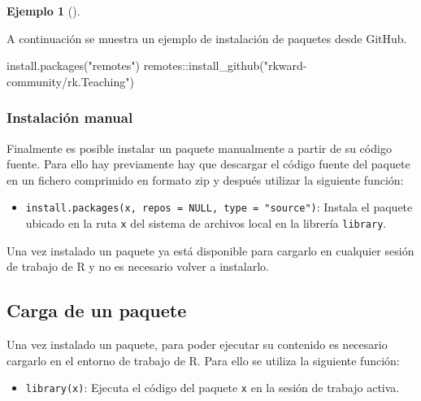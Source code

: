 \documentclass[
  a4paper,
]{scrreport}
\newenvironment{Shaded}{\begin{snugshade}}{\end{snugshade}}
\newcommand{\FunctionTok}[1]{\textcolor[rgb]{0.28,0.35,0.67}{#1}}
\newcommand{\NormalTok}[1]{\textcolor[rgb]{0.00,0.23,0.31}{#1}}
\newcommand{\SpecialCharTok}[1]{\textcolor[rgb]{0.37,0.37,0.37}{#1}}
\newcommand{\StringTok}[1]{\textcolor[rgb]{0.13,0.47,0.30}{#1}}
\providecommand{\tightlist}{%
  \setlength{\itemsep}{0pt}\setlength{\parskip}{0pt}}\usepackage{longtable,booktabs,array}
\theoremstyle{definition}
\newtheorem{example}{Ejemplo}[chapter]
\theoremstyle{definition}
\theoremstyle{remark}
\begin{document}
\leavevmode{}%
\begin{example}[]\label{exm-instalacion-paquetes-github}

A continuación se muestra un ejemplo de instalación de paquetes desde
GitHub.

\begin{Shaded}
\begin{Highlighting}[]
\FunctionTok{install.packages}\NormalTok{(}\StringTok{"remotes"}\NormalTok{)}
\NormalTok{remotes}\SpecialCharTok{::}\FunctionTok{install\_github}\NormalTok{(}\StringTok{"rkward{-}community/rk.Teaching"}\NormalTok{)}
\end{Highlighting}
\end{Shaded}

\end{example}

\hypertarget{instalaciuxf3n-manual}{%
\subsubsection{Instalación manual}\label{instalaciuxf3n-manual}}

Finalmente es posible instalar un paquete manualmente a partir de su
código fuente. Para ello hay previamente hay que descargar el código
fuente del paquete en un fichero comprimido en formato zip y después
utilizar la siguiente función:

\begin{itemize}
\tightlist
\item
  \texttt{install.packages(x,\ repos\ =\ NULL,\ type\ =\ "source")}:
  Instala el paquete ubicado en la ruta \texttt{x} del sistema de
  archivos local en la librería \texttt{library}.
\end{itemize}

Una vez instalado un paquete ya está disponible para cargarlo en
cualquier sesión de trabajo de R y no es necesario volver a instalarlo.

\hypertarget{carga-de-un-paquete}{%
\subsection{Carga de un paquete}\label{carga-de-un-paquete}}

Una vez instalado un paquete, para poder ejecutar su contenido es
necesario cargarlo en el entorno de trabajo de R. Para ello se utiliza
la siguiente función:

\begin{itemize}
\tightlist
\item
  \texttt{library(x)}: Ejecuta el código del paquete \texttt{x} en la
  sesión de trabajo activa.
\end{itemize}
\end{document}
